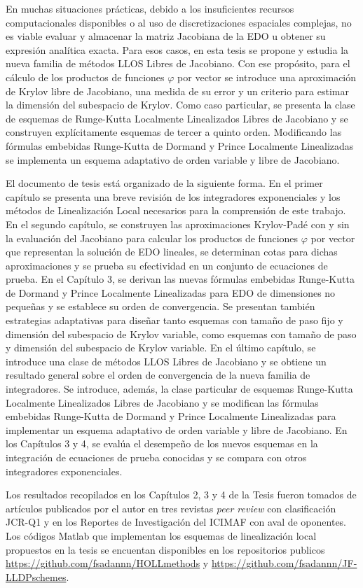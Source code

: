 En muchas situaciones prácticas, debido a los insuficientes recursos computacionales disponibles o al uso de discretizaciones espaciales complejas, no es viable evaluar y almacenar la matriz Jacobiana de la EDO u obtener su expresión analítica exacta. Para esos casos, en esta tesis se propone y estudia la nueva familia de métodos LLOS Libres de Jacobiano. Con ese propósito, para el cálculo de los productos de funciones $\varphi$ por vector se introduce una aproximación de Krylov libre de Jacobiano, una medida de su error y un criterio para estimar la dimensión del subespacio de Krylov. Como caso particular, se presenta la clase de esquemas de Runge-Kutta Localmente Linealizados Libres de Jacobiano y se construyen explícitamente esquemas de tercer a quinto orden. Modificando las fórmulas embebidas  Runge-Kutta de Dormand y Prince Localmente Linealizadas se implementa un esquema adaptativo de orden variable y libre de Jacobiano.

El documento de tesis está organizado de la siguiente forma. En el primer capítulo se presenta una breve revisión de los integradores exponenciales y los métodos de Linealización Local necesarios para la comprensión de este trabajo. En el segundo capítulo, se construyen las aproximaciones Krylov-Padé con y sin la evaluación del Jacobiano para calcular los productos de funciones $\varphi$ por vector que representan la solución de EDO lineales, se determinan cotas para dichas aproximaciones y se prueba su efectividad en un conjunto de ecuaciones de prueba. En el Capítulo 3, se derivan las nuevas fórmulas embebidas Runge-Kutta de Dormand y Prince Localmente Linealizadas para EDO de dimensiones no pequeñas y se establece su orden de convergencia. Se presentan también estrategias adaptativas para diseñar tanto esquemas con tamaño de paso fijo y dimensión del subespacio de Krylov variable, como esquemas con tamaño de paso y dimensión del subespacio de Krylov variable. En el último capítulo, se introduce una clase de métodos LLOS Libres de Jacobiano y se obtiene un resultado general sobre el orden de convergencia de la nueva familia de integradores. Se introduce, además, la clase particular de esquemas Runge-Kutta Localmente Linealizados Libres de Jacobiano y se modifican las fórmulas embebidas Runge-Kutta  de Dormand y Prince Localmente Linealizadas para implementar un esquema adaptativo de orden variable y libre de Jacobiano.
En los Capítulos 3 y 4, se evalúa el desempeño de los nuevos esquemas en la integración de ecuaciones de prueba conocidas y se compara con otros integradores exponenciales.

Los resultados recopilados en los Capítulos 2, 3 y 4 de la Tesis fueron tomados de artículos \cite{naranjo2021locally,naranjo2023jacobian,naranjo2023computing} publicados por el autor en tres revistas \textit{peer review} con clasificación JCR-Q1 y en los Reportes de Investigación del ICIMAF \cite{naranjo2022RT,naranjo2023RT} con aval de oponentes. Los códigos Matlab que implementan los esquemas de linealización local propuestos en la tesis se encuentan disponibles en los repositorios publicos \url{https://github.com/fsadannn/HOLLmethods} y
\url{https://github.com/fsadannn/JF-LLDPschemes}.

